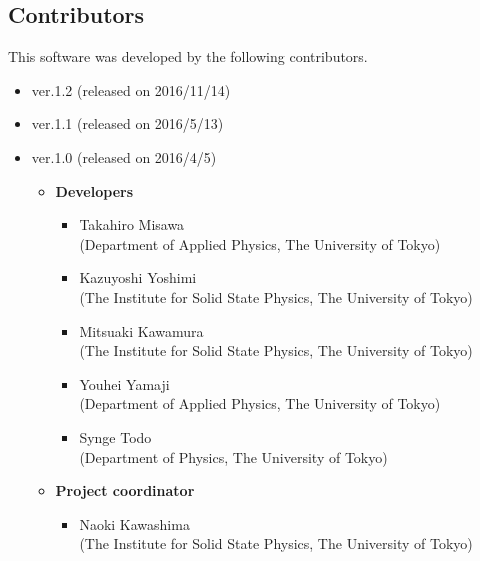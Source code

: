 \subsection{Contributors}
\label{subsec:contributors}
This software was developed by the following contributors.
\begin{itemize}
\item{ver.1.2 (released on 2016/11/14)}
\item{ver.1.1 (released on 2016/5/13)}
\item{ver.1.0 (released on 2016/4/5)}
\begin{itemize}
	\item{\bf Developers}
	\begin{itemize}
	\item{Takahiro Misawa \\(Department of Applied Physics, The University of Tokyo)}
	\item{Kazuyoshi Yoshimi\\ (The Institute for Solid State Physics, The University of Tokyo)}
	\item{Mitsuaki Kawamura\\ (The Institute for Solid State Physics, The University of Tokyo)}
	\item{Youhei Yamaji\\ (Department of Applied Physics, The University of Tokyo)}
	\item{Synge Todo\\ (Department of Physics, The University of Tokyo)}
	\end{itemize}
	\item{\bf Project coordinator}
	\begin{itemize}
	\item{Naoki Kawashima\\ (The Institute for Solid State Physics, The University of Tokyo)}
	\end{itemize}
\end{itemize}


\end{itemize}
